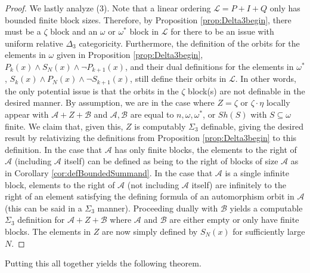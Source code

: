 \documentclass[11pt]{amsart}
\theoremstyle{definition}
\def\A{\mathcal A}
\def\B{\mathcal{B}}
\def\L{\mathcal L}
\begin{document}
\begin{proof}
    We lastly analyze (3).
    Note that a linear ordering $\L=P+I+Q$ only has bounded finite block sizes.
    Therefore, by Proposition \ref{prop:Delta3begin}, there must be a $\zeta$ block and an $\omega$ or $\omega^*$ block in $\L$ for there to be an issue with uniform relative $\Delta_3$ categoricity.
    Furthermore, the definition of the orbits for the elements in $\omega$ given in  Proposition \ref{prop:Delta3begin}, $P_k(x)\land S_N(x)\land \lnot P_{k+1}(x)$, and their dual definitions for the elements in $\omega^*$, $S_k(x)\land P_N(x)\land \lnot S_{k+1}(x)$, still define their orbits in $\L$.
    In other words, the only potential issue is that the orbits in the $\zeta$ block(s) are not definable in the desired manner.
    By assumption, we are in the case where $Z=\zeta$ or $\zeta\cdot\eta$ locally appear with $\A+Z+\B$ and $\A,\B$ are equal to $n,\omega,\omega^*$, or $Sh(S)$ with $S\subseteq \omega$ finite.
    We claim that, given this, $Z$ is computably $\Sigma_3$ definable, giving the desired result by relativizing the definitions from Proposition \ref{prop:Delta3begin} to this definition.
    In the case that $\A$ has only finite blocks, the elements to the right of $\A$ (including $\A$ itself) can be defined as being to the right of blocks of size $\A$ as in Corollary \ref{cor:defBoundedSummand}.
    In the case that $\A$ is a single infinite block, elements to the right of $\A$ (not including $\A$ itself) are infinitely to the right of an element satisfying the defining formula of an automorphism orbit in $\A$ (this can be said in a $\Sigma_3$ manner).
    Proceeding dually with $\B$ yields a computable $\Sigma_3$ definition for $\A+Z+\B$ where $\A$ and $\B$ are either empty or only have finite blocks.
    The elements in $Z$ are now simply defined by $S_N(x)$ for sufficiently large $N$.
    \end{proof}

    Putting this all together yields the following theorem.
\end{document}
